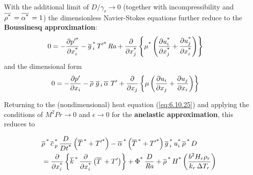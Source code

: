 \documentclass[document.tex]{subfiles}
\begin{document}
With the additional limit of $D/\gamma_r \to 0$ (together with incompressibility 
and $\overline{\rho^{\textup{*}}}\,=\overline{\alpha^{\textup{*}}}\,= 1$) the dimensionless Navier-Stokes equations further reduce to 
the \textbf{Boussinesq approximation}: 
\begin{align}
  0 &= - \pdv{\ensuremath p'^{\textup{*}}}{\ensuremath x_i^{\textup{*}}}
    - \overline{g}\,_i^{\textup{*}}\, T'^{\textup{*}}\, \mathit{Ra}
    + \pdv{\ensuremath x_j^{\textup{*}}}
    \left\{ \mu^{\textup{*}}
    \left( \pdv{\ensuremath u_i^{\textup{*}}}{\ensuremath x_j^{\textup{*}}} + \pdv{\ensuremath u_j^{\textup{*}}}{\ensuremath x_i^{\textup{*}}} \right)
    \right\}
  \label{eq:6.10.23}
\end{align}
and the dimensional form
\begin{align}
  0 &= - \pdv{p'}{x_i}
    - \overline{\rho}\,\,\overline{g}\,_i\,\overline{\alpha}\,\, T'
    + \pdv{x_j}
    \left\{ \mu
    \left( \pdv{u_i}{x_j} + \pdv{u_j}{x_i} \right)
    \right\}
  \label{eq:6.10.24}
\end{align}  

Returning to the (nondimensional) heat equation (\ref{eq:6.10.25}) and applying the conditions of 
$M^2Pr \to 0$ and $\epsilon \to 0$ for the \textbf{anelastic approximation}, this reduces to 

\begin{align}
  & \overline{\rho}\,^{\textup{*}}\,\overline{c}\,_p^{\textup{*}}\,
    \frac{D }{D t^{\textup{*}}}
    \left( \overline{T}\,^{\textup{*}} + T'^{\textup{*}} \right)
    - \overline{\alpha}\,^{\textup{*}}
    \left( \overline{T}\,^{\textup{*}} + T'^{\textup{*}} \right)
    \overline{g}\,_i^{\textup{*}}\,u_i^{\textup{*}}\,\overline{\rho}\,^{\textup{*}}\,D
    \nonumber \\
  & = \pdv{\ensuremath x_i^{\textup{*}}}
    \left\{ \overline{k}\,^{\textup{*}}\,\pdv{\ensuremath x_i^{\textup{*}}}
    \left( \overline{T}\, + T' \right) \right\}
    + \Phi^{\textup{*}}\,\frac{D}{\mathit{Ra}}
    + \overline{\rho}\,^{\textup{*}}\,H^{\textup{*}}
    \left( \frac{b^2 H_r \rho_r}{k_r \, \Delta T_r} \right)
  \label{eq:6.10.27}
\end{align}
\end{document}
